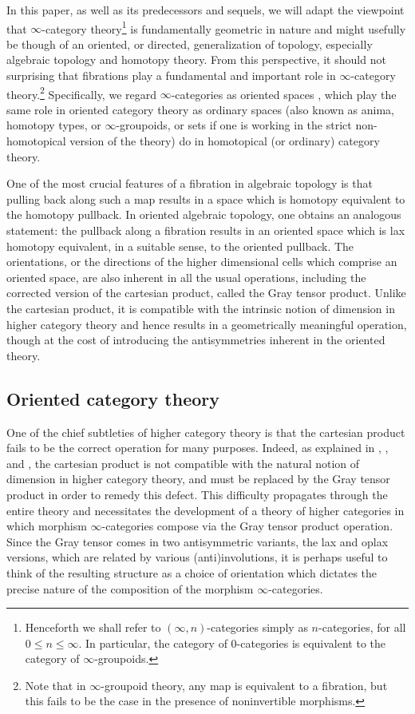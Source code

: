 \documentclass[10pt,oneside]{article}
\numberwithin{equation}{section} %
\numberwithin{figure}{section} %
\theoremstyle{plain}
\theoremstyle{definition}
\begin{document}
In this paper, as well as its predecessors and sequels, we will adapt the viewpoint that $\infty$-category theory\footnote{Henceforth we shall refer to $(\infty,n)$-categories simply as $n$-categories, for all $0\leq n\leq\infty$. In particular, the category of $0$-categories is equivalent to the category of $\infty$-groupoids.} is fundamentally geometric in nature and might usefully be though of an oriented, or directed, generalization of topology, especially algebraic topology and homotopy theory.
From this perspective, it should not surprising that fibrations play a fundamental and important role in $\infty$-category theory.\footnote{Note that in $\infty$-groupoid theory, any map is equivalent to a fibration, but this fails to be the case in the presence of noninvertible morphisms.}
Specifically, we regard $\infty$-categories as oriented spaces \cite{oriented}, which play the same role in oriented category theory as ordinary spaces (also known as anima, homotopy types, or $\infty$-groupoids, or sets if one is working in the strict non-homotopical version of the theory) do in homotopical (or ordinary) category theory.

One of the most crucial features of a fibration in algebraic topology is that pulling back along such a map results in a space which is homotopy equivalent to the homotopy pullback.
In oriented algebraic topology, one obtains an analogous statement: the pullback along a fibration results in an oriented space which is lax homotopy equivalent, in a suitable sense, to the oriented pullback.
The orientations, or the directions of the higher dimensional cells which comprise an oriented space, are also inherent in all the usual operations, including the corrected version of the cartesian product, called the Gray tensor product.
Unlike the cartesian product, it is compatible with the intrinsic notion of dimension in higher category theory and hence results in a geometrically meaningful operation, though at the cost of introducing the antisymmetries inherent in the oriented theory.


\subsection{Oriented category theory}
One of the chief subtleties of higher category theory is that the cartesian product fails to be the correct operation for many purposes.
Indeed, as explained in \cite{GepnerHeine2026}, \cite{oriented}, and \cite{gepner2026homotopy}, the cartesian product is not compatible with the natural notion of dimension in higher category theory, and must be replaced by the Gray tensor product in order to remedy this defect.
This difficulty propagates through the entire theory and necessitates the development of a theory of higher categories in which morphism $\infty$-categories compose via the Gray tensor product operation.
Since the Gray tensor comes in two antisymmetric variants, the lax and oplax versions, which are related by various (anti)involutions, it is perhaps useful to think of the resulting structure as a choice of orientation which dictates the precise nature of the composition of the morphism $\infty$-categories.
\end{document}
